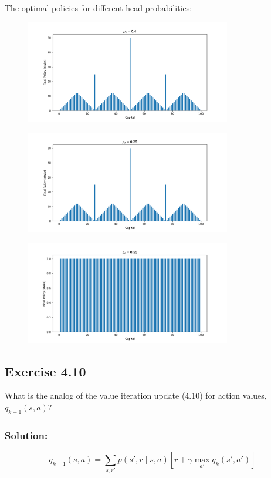 The optimal policies for different head probabilities:
\begin{figure}[H]
    \centering
    \includegraphics[width=0.8\textwidth]{chapters_latex/figures/ex_04_09_policies_04.pdf}
\end{figure}

\begin{figure}[H]
    \centering
    \includegraphics[width=0.8\textwidth]{chapters_latex/figures/ex_04_09_policies_025.pdf}
\end{figure}

\begin{figure}[H]
    \centering
    \includegraphics[width=0.8\textwidth]{chapters_latex/figures/ex_04_09_policies_055.pdf}
\end{figure}

\subsection*{Exercise 4.10}

What is the analog of the value iteration update (4.10) for action values,
$q_{k+1}(s,a)$?

\subsubsection*{Solution:}
\[
    q_{k+1}(s,a) = \sum_{s,r'} p(s',r \mid s, a) \left[r + \gamma \max_{a'} q_{k}(s',a') \right]
\]